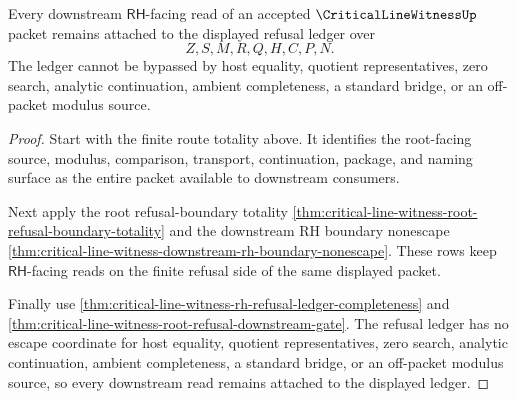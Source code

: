 \begin{theorem}
\label{thm:critical-line-witness-root-refusal-ledger-nonescape}
Every downstream $\mathsf{RH}$-facing read of an accepted
$\CriticalLineWitnessUp$ packet remains attached to the displayed refusal
ledger over
$$
Z,S,M,R,Q,H,C,P,N.
$$
The ledger cannot be bypassed by host equality, quotient representatives, zero
search, analytic continuation, ambient completeness, a standard bridge, or an
off-packet modulus source.
\end{theorem}
\begin{proof}
Start with the finite route totality above. It identifies the root-facing
source, modulus, comparison, transport, continuation, package, and naming
surface as the entire packet available to downstream consumers.

Next apply the root refusal-boundary totality
\autoref{thm:critical-line-witness-root-refusal-boundary-totality} and the
downstream RH boundary nonescape
\autoref{thm:critical-line-witness-downstream-rh-boundary-nonescape}. These
rows keep $\mathsf{RH}$-facing reads on the finite refusal side of the same
displayed packet.

Finally use
\autoref{thm:critical-line-witness-rh-refusal-ledger-completeness} and
\autoref{thm:critical-line-witness-root-refusal-downstream-gate}. The refusal
ledger has no escape coordinate for host equality, quotient representatives,
zero search, analytic continuation, ambient completeness, a standard bridge,
or an off-packet modulus source, so every downstream read remains attached to
the displayed ledger.
\end{proof}
